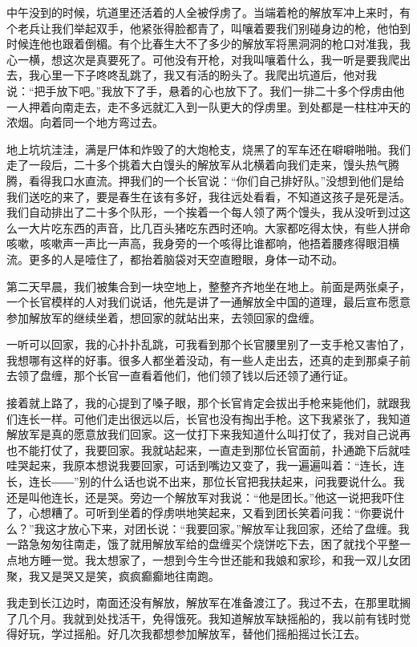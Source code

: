 \documentclass[12pt,UTF8]{ctexbook}
\begin{document}
中午没到的时候，坑道里还活着的人全被俘虏了。当端着枪的解放军冲上来时，有个老兵让我们举起双手，他紧张得脸都青了，叫嚷着要我们别碰身边的枪，他怕到时候连他也跟着倒楣。有个比春生大不了多少的解放军将黑洞洞的枪口对准我，我心一横，想这次是真要死了。可他没有开枪，对我叫嚷着什么，我一听是要我爬出去，我心里一下子咚咚乱跳了，我又有活的盼头了。我爬出坑道后，他对我说：“把手放下吧。”我放下了手，悬着的心也放下了。我们一排二十多个俘虏由他一人押着向南走去，走不多远就汇入到一队更大的俘虏里。到处都是一柱柱冲天的浓烟。向着同一个地方弯过去。

地上坑坑洼洼，满是尸体和炸毁了的大炮枪支，烧黑了的军车还在噼噼啪啪。我们走了一段后，二十多个挑着大白馒头的解放军从北横着向我们走来，馒头热气腾腾，看得我口水直流。押我们的一个长官说：“你们自己排好队。”没想到他们是给我们送吃的来了，要是春生在该有多好，我往远处看看，不知道这孩子是死是活。我们自动排出了二十多个队形，一个挨着一个每人领了两个馒头，我从没听到过这么一大片吃东西的声音，比几百头猪吃东西时还响。大家都吃得太快，有些人拼命咳嗽，咳嗽声一声比一声高，我身旁的一个咳得比谁都响，他捂着腰疼得眼泪横流。更多的人是噎住了，都抬着脑袋对天空直瞪眼，身体一动不动。

第二天早晨，我们被集合到一块空地上，整整齐齐地坐在地上。前面是两张桌子，一个长官模样的人对我们说话，他先是讲了一通解放全中国的道理，最后宣布愿意参加解放军的继续坐着，想回家的就站出来，去领回家的盘缠。

一听可以回家，我的心扑扑乱跳，可我看到那个长官腰里别了一支手枪又害怕了，我想哪有这样的好事。很多人都坐着没动，有一些人走出去，还真的走到那桌子前去领了盘缠，那个长官一直看着他们，他们领了钱以后还领了通行证。

接着就上路了，我的心提到了嗓子眼，那个长官肯定会拔出手枪来毙他们，就跟我们连长一样。可他们走出很远以后，长官也没有掏出手枪。这下我紧张了，我知道解放军是真的愿意放我们回家。这一仗打下来我知道什么叫打仗了，我对自己说再也不能打仗了，我要回家。我就站起来，一直走到那位长官面前，扑通跪下后就哇哇哭起来，我原本想说我要回家，可话到嘴边又变了，我一遍遍叫着：“连长，连长，连长――”别的什么话也说不出来，那位长官把我扶起来，问我要说什么。我还是叫他连长，还是哭。旁边一个解放军对我说：“他是团长。”他这一说把我吓住了，心想糟了。可听到坐着的俘虏哄地笑起来，又看到团长笑着问我：“你要说什么？”我这才放心下来，对团长说：“我要回家。”解放军让我回家，还给了盘缠。我一路急匆匆往南走，饿了就用解放军给的盘缠买个烧饼吃下去，困了就找个平整一点地方睡一觉。我太想家了，一想到今生今世还能和我娘和家珍，和我一双儿女团聚，我又是哭又是笑，疯疯癫癫地往南跑。

我走到长江边时，南面还没有解放，解放军在准备渡江了。我过不去，在那里耽搁了几个月。我就到处找活干，免得饿死。我知道解放军缺摇船的，我以前有钱时觉得好玩，学过摇船。好几次我都想参加解放军，替他们摇船摇过长江去。
\end{document}
